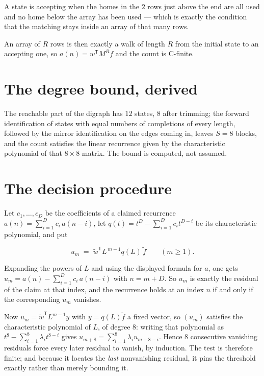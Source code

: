 \documentclass[11pt]{article}
\theoremstyle{definition}
\begin{document}
A state is accepting when the homes in the $2$ rows just above the end are all used and no home below the array has been used --- which is exactly the condition that the matching stays inside an array of that many rows.

An array of $R$ rows is then exactly a walk of length $R$ from the initial state to an accepting one, so $a(n) = w^{\mathsf T}M^{R}f$ and the count is C-finite.

\section{The degree bound, derived}

The reachable part of the digraph has $12$ states, $8$ after trimming; the forward identification of states with equal numbers of completions of every length, followed by the mirror identification on the edges coming in, leaves $S = 8$ blocks, and the count satisfies the linear recurrence given by the characteristic polynomial of that $8\times8$ matrix. The bound is computed, not assumed.

\section{The decision procedure}

Let $c_1,\dots,c_D$ be the coefficients of a claimed recurrence $a(n) = \sum_{i=1}^{D} c_i\,a(n-i)$, let $q(t) = t^{D} - \sum_{i=1}^{D} c_i t^{D-i}$ be its characteristic polynomial, and put

\[u_m \;=\; \tilde w^{\mathsf T} L^{\,m-1} q(L)\,\tilde f \qquad (m \ge 1).\]

Expanding the powers of $L$ and using the displayed formula for $a$, one gets $u_m = a(n) - \sum_{i=1}^{D} c_i\,a(n-i)$ with $n = m + D$. So $u_m$ is exactly the residual of the claim at that index, and the recurrence holds at an index $n$ if and only if the corresponding $u_m$ vanishes.

Now $u_m = \tilde w^{\mathsf T} L^{m-1} y$ with $y = q(L)\tilde f$ a fixed vector, so $(u_m)$ satisfies the characteristic polynomial of $L$, of degree $8$: writing that polynomial as $t^{8} - \sum_{i=1}^{8} \lambda_i t^{8-i}$ gives $u_{m+8} = \sum_{i=1}^{8} \lambda_i u_{m+8-i}$. Hence $8$ consecutive vanishing residuals force every later residual to vanish, by induction. The test is therefore finite; and because it locates the {\itshape last} nonvanishing residual, it pins the threshold exactly rather than merely bounding it.
\end{document}
